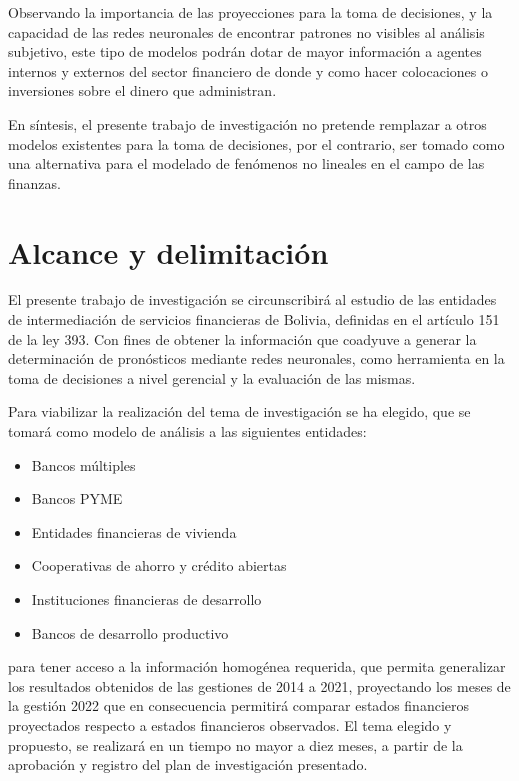 \documentclass[
  12pt,
]{article}
\providecommand{\tightlist}{%
  \setlength{\itemsep}{0pt}\setlength{\parskip}{0pt}}
\begin{document}
Observando la importancia de las proyecciones para la toma de
decisiones, y la capacidad de las redes neuronales de encontrar patrones
no visibles al análisis subjetivo, este tipo de modelos podrán dotar de
mayor información a agentes internos y externos del sector financiero de
donde y como hacer colocaciones o inversiones sobre el dinero que
administran.

En síntesis, el presente trabajo de investigación no pretende remplazar
a otros modelos existentes para la toma de decisiones, por el contrario,
ser tomado como una alternativa para el modelado de fenómenos no
lineales en el campo de las finanzas.

\hypertarget{alcance-y-delimitaciuxf3n}{%
\section{Alcance y delimitación}\label{alcance-y-delimitaciuxf3n}}

El presente trabajo de investigación se circunscribirá al estudio de las
entidades de intermediación de servicios financieras de Bolivia,
definidas en el artículo 151 de la ley 393. Con fines de obtener la
información que coadyuve a generar la determinación de pronósticos
mediante redes neuronales, como herramienta en la toma de decisiones a
nivel gerencial y la evaluación de las mismas.

Para viabilizar la realización del tema de investigación se ha elegido,
que se tomará como modelo de análisis a las siguientes entidades:

\begin{itemize}
\tightlist
\item
  Bancos múltiples
\item
  Bancos PYME
\item
  Entidades financieras de vivienda
\item
  Cooperativas de ahorro y crédito abiertas
\item
  Instituciones financieras de desarrollo
\item
  Bancos de desarrollo productivo
\end{itemize}

para tener acceso a la información homogénea requerida, que permita
generalizar los resultados obtenidos de las gestiones de 2014 a 2021,
proyectando los meses de la gestión 2022 que en consecuencia permitirá
comparar estados financieros proyectados respecto a estados financieros
observados. El tema elegido y propuesto, se realizará en un tiempo no
mayor a diez meses, a partir de la aprobación y registro del plan de
investigación presentado.
\end{document}
